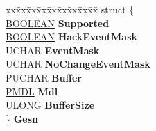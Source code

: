 \begin{DoxyCompactItemize}
\item 
\mbox{\label{struct___m_e_d_i_a___c_h_a_n_g_e___d_e_t_e_c_t_i_o_n___i_n_f_o_a46d34ef32a75026eda718158f9e81aae}} 
\begin{tabbing}
xx\=xx\=xx\=xx\=xx\=xx\=xx\=xx\=xx\=\kill
struct \{\\
\>\hyperlink{_processor_bind_8h_a112e3146cb38b6ee95e64d85842e380a}{BOOLEAN} {\bfseries Supported}\\
\>\hyperlink{_processor_bind_8h_a112e3146cb38b6ee95e64d85842e380a}{BOOLEAN} {\bfseries HackEventMask}\\
\>UCHAR {\bfseries EventMask}\\
\>UCHAR {\bfseries NoChangeEventMask}\\
\>PUCHAR {\bfseries Buffer}\\
\>\hyperlink{interfacevoid}{PMDL} {\bfseries Mdl}\\
\>ULONG {\bfseries BufferSize}\\
\} {\bfseries Gesn}\\


\end{tabbing}
\end{DoxyCompactItemize}
